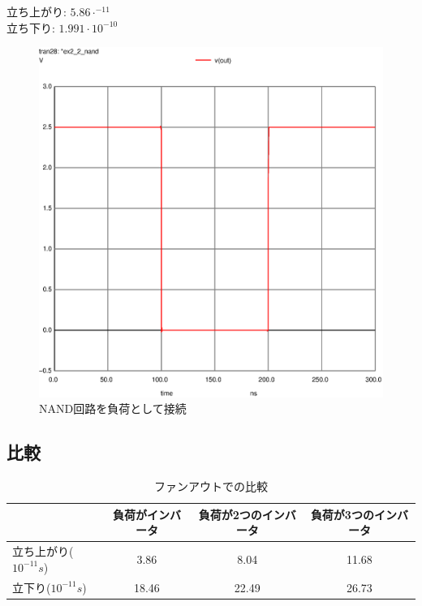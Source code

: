 \documentclass{jsarticle}
\begin{document}
\begin{flushleft}
    立ち上がり: $5.86 \cdot ^{-11}$\\
    立ち下り: $1.991 \cdot 10^{-10}$
\end{flushleft}
\begin{figure}[H]
    \hspace{50pt}
    \includegraphics[scale=0.8]{ex2_2_nand.ps}
    \vspace{30pt}
    \caption{NAND回路を負荷として接続}
\end{figure}


\subsection{比較}
\begin{table}[H]
    \caption{ファンアウトでの比較}
    \centering
    \begin{tabular}{|l|c|c|c|} \hline
        &負荷がインバータ&負荷が2つのインバータ&負荷が3つのインバータ \\ \hline \hline
        立ち上がり($10^{-11} s$)&3.86&8.04&11.68\\
        立下り($10^{-11} s$)&18.46&22.49&26.73\\
        \hline
    \end{tabular}
\end{table}
\end{document}
